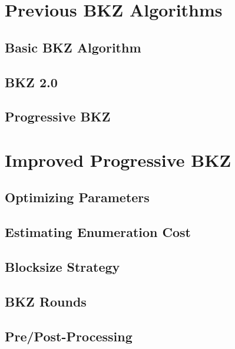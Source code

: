 \documentclass{beamer}
\begin{document}
\section{Previous BKZ Algorithms}

\subsection{Basic BKZ Algorithm}

\subsection{BKZ 2.0}

\subsection{Progressive BKZ}

\section{Improved Progressive BKZ}

\subsection{Optimizing Parameters}

\subsection{Estimating Enumeration Cost}

\subsection{Blocksize Strategy}

\subsection{BKZ Rounds}

\subsection{Pre/Post-Processing}

\end{document}
